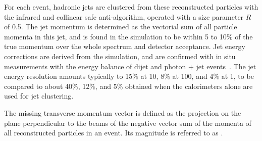 For each event, hadronic jets are clustered from these reconstructed
particles with the infrared and collinear safe anti-\kt algorithm,
operated with a size parameter $R$ of 0.5. The jet momentum is
determined as the vectorial sum of all particle momenta in this jet,
and is found in the simulation to be within 5 to 10\% of the true
momentum over the whole \pt spectrum and detector acceptance. Jet
energy corrections are derived from the simulation, and are confirmed
with in situ measurements with the energy balance of dijet and photon
+ jet events~\cite{Chatrchyan:2011ds}. The jet energy resolution
amounts typically to 15\% at 10\GeV, 8\% at 100\GeV, and 4\% at 1\TeV,
to be compared to about 40\%, 12\%, and 5\% obtained when the
calorimeters alone are used for jet clustering.

The missing transverse momentum vector \ptvecmiss is defined as the
projection on the plane perpendicular to the beams of the negative
vector sum of the momenta of all reconstructed particles in an
event. Its magnitude is referred to as \ETmiss.
